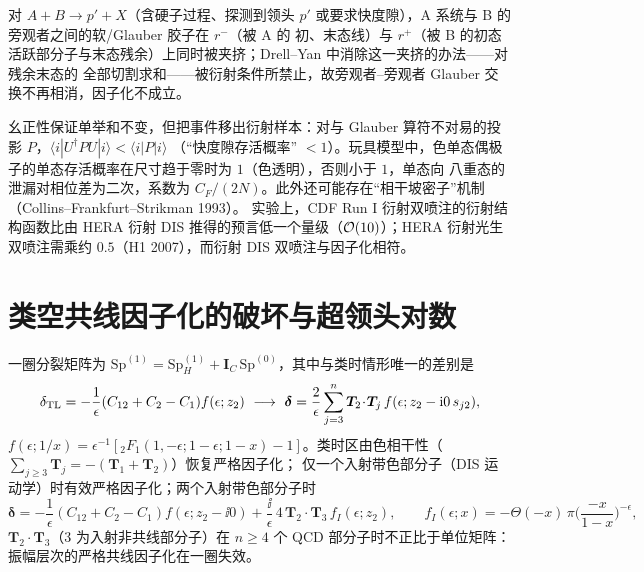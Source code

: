 \begin{proposition}\label{prop:glb-hhdiff}
对 $A+B\to p'+X$（含硬子过程、探测到领头 $p'$ 或要求快度隙），A 系统与 B 的旁观者之间的软/Glauber 胶子在 $r^-$（被 A 的
初、末态线）与 $r^+$（被 B 的初态活跃部分子与末态残余）上同时被夹挤；Drell--Yan 中消除这一夹挤的办法——对残余末态的
全部切割求和——被衍射条件所禁止，故旁观者–旁观者 Glauber 交换不再相消，因子化不成立。
\end{proposition}
幺正性保证单举和不变，但把事件移出衍射样本：对与 Glauber 算符不对易的投影 $P$，$\langle i|U^\dagger PU|i\rangle<\langle i|P|i\rangle$
（“快度隙存活概率” $<1$）。玩具模型中，色单态偶极子的单态存活概率在尺寸趋于零时为 $1$（色透明），否则小于 $1$，单态向
八重态的泄漏对相位差为二次，系数为 $C_F/(2N)$。此外还可能存在“相干坡密子”机制（Collins--Frankfurt--Strikman 1993）。
实验上，CDF Run I 衍射双喷注的衍射结构函数比由 HERA 衍射 DIS 推得的预言低一个量级（$\mathcal{O}\!\left(10\right)$）；HERA 衍射光生
双喷注需乘约 $0.5$（H1 2007），而衍射 DIS 双喷注与因子化相符。%

\section{类空共线因子化的破坏与超领头对数}\label{sec:glb-sl}

\begin{proposition}\label{prop:glb-sl1}
一圈分裂矩阵为 $\mathrm{Sp}^{(1)}=\mathrm{Sp}^{(1)}_H+\bm I_C\,\mathrm{Sp}^{(0)}$，其中与类时情形唯一的差别是
\begin{equation}\label{eq:glb-delta}
\delta_{\rm TL}=-\frac1\epsilon(C_{12}+C_2-C_1)f(\epsilon;z_2)\ \longrightarrow\
\bm\delta=\frac2\epsilon\sum_{j=3}^n\bm T_2\!\cdot\!\bm T_j\,f(\epsilon;z_2-\ii0\,s_{j2}),
\end{equation}
$f(\epsilon;1/x)=\epsilon^{-1}[{}_2F_1(1,-\epsilon;1-\epsilon;1-x)-1]$。类时区由色相干性（$\sum_{j\ge3}\bm T_j=-(\bm T_1+\bm T_2)$）恢复严格因子化；
仅一个入射带色部分子（DIS 运动学）时有效严格因子化；两个入射带色部分子时
\begin{equation}\label{eq:glb-deltahh}
\bm\delta=-\frac1\epsilon(C_{12}+C_2-C_1)f(\epsilon;z_2-\ii0)+\frac{\ii}{\epsilon}\,4\,\bm T_2\!\cdot\!\bm T_3\,f_I(\epsilon;z_2),\qquad
f_I(\epsilon;x)=-\Theta(-x)\,\pi\Big(\frac{-x}{1-x}\Big)^{-\epsilon},
\end{equation}
$\bm T_2\!\cdot\!\bm T_3$（3 为入射非共线部分子）在 $n\ge4$ 个 QCD 部分子时不正比于单位矩阵：振幅层次的严格共线因子化在一圈失效。
\end{proposition}

